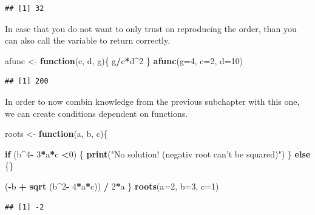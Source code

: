 \documentclass[]{report}
\newenvironment{Shaded}{\begin{snugshade}}{\end{snugshade}}
\newcommand{\KeywordTok}[1]{\textcolor[rgb]{0.13,0.29,0.53}{\textbf{#1}}}
\newcommand{\DataTypeTok}[1]{\textcolor[rgb]{0.13,0.29,0.53}{#1}}
\newcommand{\DecValTok}[1]{\textcolor[rgb]{0.00,0.00,0.81}{#1}}
\newcommand{\StringTok}[1]{\textcolor[rgb]{0.31,0.60,0.02}{#1}}
\newcommand{\ControlFlowTok}[1]{\textcolor[rgb]{0.13,0.29,0.53}{\textbf{#1}}}
\newcommand{\OperatorTok}[1]{\textcolor[rgb]{0.81,0.36,0.00}{\textbf{#1}}}
\newcommand{\NormalTok}[1]{#1}
\begin{document}
\begin{verbatim}
## [1] 32
\end{verbatim}

In case that you do not want to only trust on reproducing the order,
than you can also call the variable to return correctly.

\begin{Shaded}
\begin{Highlighting}[]
\NormalTok{afunc <-}\StringTok{ }\ControlFlowTok{function}\NormalTok{(c, d, g)\{}
\NormalTok{  g}\OperatorTok{/}\NormalTok{c}\OperatorTok{*}\NormalTok{d}\OperatorTok{^}\DecValTok{2}
\NormalTok{\}}
\KeywordTok{afunc}\NormalTok{(}\DataTypeTok{g=}\DecValTok{4}\NormalTok{, }\DataTypeTok{c=}\DecValTok{2}\NormalTok{, }\DataTypeTok{d=}\DecValTok{10}\NormalTok{)}
\end{Highlighting}
\end{Shaded}

\begin{verbatim}
## [1] 200
\end{verbatim}

In order to now combin knowledge from the previous subchapter with this
one, we can create conditions dependent on functions.

\begin{Shaded}
\begin{Highlighting}[]
\NormalTok{roots <-}\StringTok{ }\ControlFlowTok{function}\NormalTok{(a, b, c)\{}
  
  \ControlFlowTok{if}\NormalTok{ (b}\OperatorTok{^}\DecValTok{4}\OperatorTok{-}\StringTok{ }\DecValTok{3}\OperatorTok{*}\NormalTok{a}\OperatorTok{*}\NormalTok{c }\OperatorTok{<}\DecValTok{0}\NormalTok{) \{}
    \KeywordTok{print}\NormalTok{(}\StringTok{"No solution! (negativ root can't be squared)"}\NormalTok{)}
\NormalTok{  \} }\ControlFlowTok{else}\NormalTok{ \{\}}
  
\NormalTok{  (}\OperatorTok{-}\NormalTok{b }\OperatorTok{+}\StringTok{ }\KeywordTok{sqrt}\NormalTok{ (b}\OperatorTok{^}\DecValTok{2}\OperatorTok{-}\StringTok{ }\DecValTok{4}\OperatorTok{*}\NormalTok{a}\OperatorTok{*}\NormalTok{c)) }\OperatorTok{/}\StringTok{ }\DecValTok{2}\OperatorTok{*}\NormalTok{a}
\NormalTok{\}}
\KeywordTok{roots}\NormalTok{(}\DataTypeTok{a=}\DecValTok{2}\NormalTok{, }\DataTypeTok{b=}\DecValTok{3}\NormalTok{, }\DataTypeTok{c=}\DecValTok{1}\NormalTok{)}
\end{Highlighting}
\end{Shaded}

\begin{verbatim}
## [1] -2
\end{verbatim}
\end{document}
